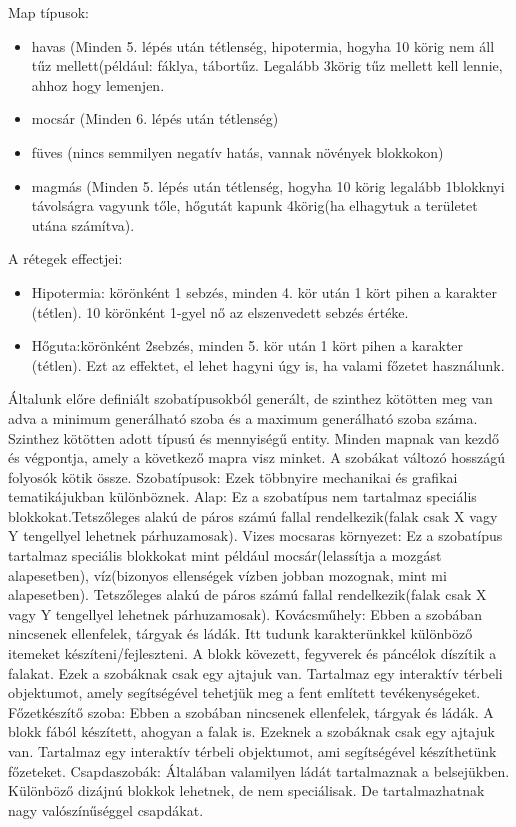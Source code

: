 
Map típusok:
\begin{itemize}
    \item havas (Minden 5. lépés után tétlenség, hipotermia, hogyha 10 körig nem áll tűz mellett(például: fáklya, tábortűz. Legalább 3körig tűz mellett kell lennie, ahhoz hogy lemenjen. 
    \item mocsár (Minden 6. lépés után tétlenség)
    \item füves (nincs semmilyen negatív hatás, vannak növények blokkokon)
    \item magmás (Minden 5. lépés után tétlenség, hogyha 10 körig legalább 1blokknyi távolságra vagyunk tőle, hőgutát kapunk 4körig(ha elhagytuk a területet utána számítva). 
\end{itemize}
A rétegek effectjei:
\begin{itemize}
  \item Hipotermia: körönként 1 sebzés, minden 4. kör után 1 kört pihen a karakter (tétlen). 10 körönként 1-gyel nő az elszenvedett sebzés értéke.
  \item Hőguta:körönként 2sebzés, minden 5. kör után 1 kört pihen a karakter (tétlen). Ezt az effektet, el lehet hagyni úgy is, ha valami főzetet használunk.
\end{itemize}

Általunk előre definiált szobatípusokból generált, de szinthez kötötten meg van adva a minimum generálható szoba és a maximum generálható szoba száma.
Szinthez kötötten adott típusú és mennyiségű entity.
Minden mapnak van kezdő és végpontja, amely a következő mapra visz minket.
A szobákat változó hosszágú folyosók kötik össze.
Szobatípusok:
Ezek többnyire mechanikai és grafikai tematikájukban különböznek.
Alap:
Ez a szobatípus nem tartalmaz speciális blokkokat.Tetszőleges alakú de páros számú fallal rendelkezik(falak csak X vagy Y tengellyel lehetnek párhuzamosak).
Vizes mocsaras környezet:
Ez a szobatípus tartalmaz speciális blokkokat mint például mocsár(lelassítja a mozgást alapesetben), víz(bizonyos ellenségek vízben jobban mozognak, mint mi alapesetben).
Tetszőleges alakú de páros számú fallal rendelkezik(falak csak X vagy Y tengellyel lehetnek párhuzamosak).
Kovácsműhely:
Ebben a szobában nincsenek ellenfelek, tárgyak és ládák. Itt tudunk karakterünkkel különböző itemeket készíteni/fejleszteni. A blokk kövezett, fegyverek és páncélok díszítik a falakat. Ezek a szobáknak csak egy ajtajuk van. Tartalmaz egy interaktív térbeli objektumot, amely segítségével tehetjük meg a fent említett tevékenységeket.
Főzetkészítő szoba:
Ebben a szobában nincsenek ellenfelek, tárgyak és ládák. A blokk fából készített, ahogyan a falak is. Ezeknek a szobáknak csak egy ajtajuk van. Tartalmaz egy interaktív térbeli objektumot, ami segítségével készíthetünk főzeteket.
Csapdaszobák:
Általában valamilyen ládát tartalmaznak a belsejükben.
Különböző dizájnú blokkok lehetnek, de nem speciálisak. De tartalmazhatnak nagy valószínűséggel csapdákat.

